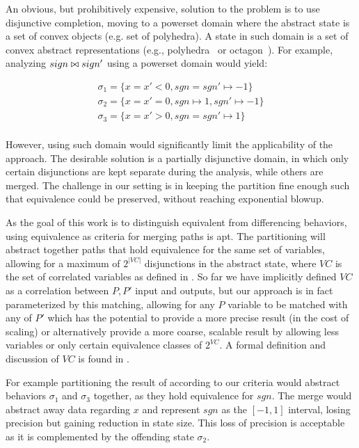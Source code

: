 An obvious, but prohibitively expensive, solution to the problem is to use disjunctive completion, moving to a powerset domain where the abstract state is a set of convex objects (e.g. set of polyhedra).
A state in such domain is a set of convex abstract representations (e.g., polyhedra~\cite{CousotHalbwachs78} or octagon~\cite{Mine2006}). For example, analyzing $sign \bowtie sign'$ using a powerset domain would yield:

{\footnotesize
\[
\begin{array}{c}
\sigma_1 = \{x = x' < 0, sgn = sgn' \mapsto -1\}\\
\sigma_2 = \{x = x' = 0, sgn \mapsto 1, sgn' \mapsto -1\}\\
\sigma_3 = \{x = x' > 0, sgn = sgn' \mapsto 1\}\\
\end{array}
\]
}

However, using such domain would significantly limit the applicability of the approach. The desirable solution is a partially disjunctive domain, in which only certain disjunctions are kept separate during the analysis, while others are merged. The challenge in our setting is in keeping the partition fine enough such that equivalence could be preserved, without reaching exponential blowup.

As the goal of this work is to distinguish equivalent from differencing behaviors, using equivalence as criteria for merging paths is apt. The partitioning will abstract together paths that hold equivalence for the same set of variables, allowing for a maximum of $2^{|VC|}$ disjunctions in the abstract state, where $VC$ is the set of correlated variables as defined in . So far we have implicitly defined $VC$ as a correlation between $P,P'$ input and outputs, but our approach is in fact parameterized by this matching, allowing for any $P$ variable to be matched with any of $P'$ which has the potential to provide a more precise result (in the cost of scaling) or alternatively provide a more coarse, scalable result by allowing less variables or only certain equivalence classes of $2^{VC}$. A formal definition and discussion of $VC$ is found in .

For example partitioning the result of  according to our criteria would abstract behaviors $\sigma_1$ and $\sigma_3$ together, as they hold equivalence for $sgn$. The merge would abstract away data regarding $x$ and represent $sgn$ as the $[-1,1]$ interval, losing precision but gaining reduction in state size. This loss of precision is acceptable as it is complemented by the offending state $\sigma_2$.

